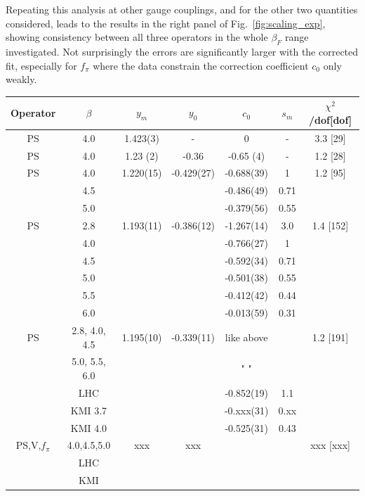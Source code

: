 \documentclass[aps,prl,twocolumn,]{revtex4}  %
\newcommand{\fig}[1]{Fig.~\ref{#1}}
\begin{document}
Repeating this analysis at other gauge couplings, and for the other two quantities considered, leads to the results in the right panel of \fig{fig:scaling_exp}, showing consistency between all three operators in the whole $\beta_F$ range investigated.
Not surprisingly the errors are significantly larger with the corrected fit, especially for $f_\pi$ where the data constrain the correction coefficient $c_0$ only weakly.
\begin{table}[htdp]
\begin{center}
\begin{tabular}{|c|c|c|c|c|c|c|}
\hline
Operator & $\beta$ & $y_m$ & $y_0$ & $c_0$ &  $ s_m $  & $\chi^2$/dof[dof]   \\
\hline\hline
PS	&	4.0	& 	1.423(3)	&	 - 		    &	0	        &	-	    	&	3.3 [29]	\\
\hline
PS	&	4.0	&	1.23 (2)	&	-0.36	    &	-0.65 (4)	&	-	    	&	1.2 [28] \\
\hline
PS	&	4.0	& 	1.220(15)	&	 -0.429(27) &	-0.688(39)	&	1	    &   1.2 [95] \\
	&	4.5	&		        &			    &	-0.486(49)	&	0.71   &	 	        \\
	&	5.0	&	        	&       		&	-0.379(56)	&	0.55	&		        \\
\hline
PS	&	2.8	& 	1.193(11)	&	 -0.386(12) &	-1.267(14)	&	3.0	    &	1.4 [152] \\
	&	4.0	& 	        	&	        	&	-0.766(27)	&	1	    &		    \\
	&	4.5	&		        &		        &	-0.592(34)	&	0.71	&	        \\
	&	5.0	&		        &		        &	-0.501(38)	&	0.55	&	        \\
	&	5.5	&		        &		        &   -0.412(42)	&	0.44	&	        \\
	&	6.0	&		        &		        &	-0.013(59)	&	0.31	&	        \\
\hline
PS	&	2.8, 4.0, 4.5	& 	1.195(10)	&	 -0.339(11)	&	like above	&		    &	1.2 [191] \\
	&	5.0, 5.5, 6.0	& 	        	&	        	&	" "	&		   &		    \\
	&	LHC\protect\cite{Fodor:2011tu}	&	&			    &	-0.852(19)	&	1.1 	& 	 \\
	&	KMI 3.7\protect\cite{Aoki:2012eq}	&	&			    &	-0.xxx(31)	&	0.xx &	 	 \\
	&	KMI 4.0\protect\cite{Aoki:2012eq}	&	&			    &	-0.525(31)	&	0.43 &	\\
\hline
PS,V,$f_\pi$	&	4.0,4.5,5.0	& 	xxx	&	xxx  	&		&		&	xxx [xxx]	\\
	&	LHC\protect\cite{Fodor:2011tu}	&		&			&		&		&	 \\
	&	KMI\protect\cite{Aoki:2012eq} 	&		&			&		&		&	 \\
\hline	
	

\end{tabular}
\end{center}
\end{table}
\end{document}
